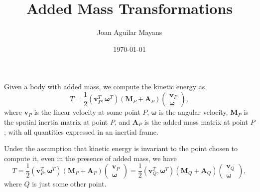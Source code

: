 \documentclass[onecolumn]{article}
\title{Added Mass Transformations}
\author{Joan Aguilar Mayans}
\date{\today}
\begin{document}
\maketitle

Given a body with added mass, we compute the kinetic energy as
\begin{equation}
    T = \frac{1}{2} \left( \bm{v}_P^T, \bm{\omega}^T \right) \left( \bm{M}_P + \bm{A}_P \right)
    \left(
    \begin{array}{c}
        \bm{v}_P \\
        \bm{\omega}
    \end{array}
    \right),
\end{equation}
where $\bm{v}_P$ is the linear velocity at some point $P$, $\bm{\omega}$ is the angular velocity, $\bm{M}_P$ is the spatial inertia matrix at point $P$, and $\bm{A}_P$ is the added mass matrix at point $P$; with all quantities expressed in an inertial frame.

Under the assumption that kinetic energy is invariant to the point chosen to compute it, even in the presence of added mass, we have
\begin{equation}
    T = \frac{1}{2} \left( \bm{v}_P^T, \bm{\omega}^T \right) \left( \bm{M}_P + \bm{A}_P \right)
    \left(
    \begin{array}{c}
        \bm{v}_P \\
        \bm{\omega}
    \end{array}
    \right)
    = \frac{1}{2} \left( \bm{v}_Q^T, \bm{\omega}^T \right) \left( \bm{M}_Q + \bm{A}_Q \right)
    \left(
    \begin{array}{c}
        \bm{v}_Q \\
        \bm{\omega}
    \end{array}
    \right),
\end{equation}
where $Q$ is just some other point.
\end{document}
